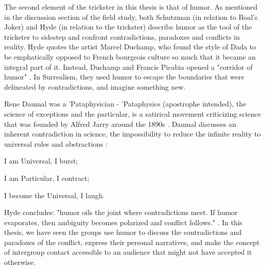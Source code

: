 \documentclass[dissertation,math,vertlayout,pdfa,colorlinks,nologo]{aaltoseries}
\begin{document}
The second element of the trickster in this thesis is that of humor. As mentioned in the discussion section of the field study, both Schutzman \cite[p. 88]{schutzmanRadicalDoubtJoker2018} (in relation to Boal's Joker) and Hyde \cite[c. 11] {hydeTricksterMakesThis2017} (in relation to the trickster) describe humor as the tool of the trickster to sidestep and confront contradictions, paradoxes and conflicts in reality. Hyde quotes the artist Marcel Duchamp, who found the style of Dada to be emphatically opposed to French bourgeois culture so much that it became an integral part of it. Instead, Duchamp and Francis Picabia opened a "corridor of humor" \cite[p. 81]{pazMarcelDuchampAppearance1990}. In Surrealism, they used humor to escape the boundaries that were delineated by contradictions, and imagine something new.

Rene Daumal was a 'Pataphysician - 'Pataphysics (apostrophe intended), the science of exceptions and the particular, is a satirical movement criticizing science that was founded by Alfred Jarry around the 1890s \cite{hugillPataphysicsUselessGuide2012}. Daumal discusses an inherent contradiction in science, the impossibility to reduce the infinite reality to universal rules and abstractions \cite[p. 15]{daumalPataphysicalEssays2012}:
\begin{displayquote}
I am Universal, I burst;

I am Particular, I contract;

I become the Universal, I laugh.
\end{displayquote}
Hyde concludes: "humor oils the joint where contradictions meet. If humor evaporates, then ambiguity becomes polarized and conflict follows." \cite[c. 11]{hydeTricksterMakesThis2017}. In this thesis, we have seen the groups use humor to discuss the contradictions and paradoxes of the conflict, express their personal narratives, and make the concept of intergroup contact accessible to an audience that might not have accepted it otherwise.
\end{document}
